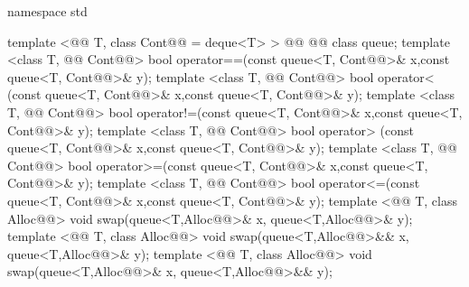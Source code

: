 \documentclass[american,twoside]{book}
\begin{document}
\begin{codeblock}
namespace std {
  template <@@ T, class Cont@@ = deque<T> >
    @@
            @@
    class queue;
  template <class T, @@ Cont@@>
    bool operator==(const queue<T, Cont@@>& x,const queue<T, Cont@@>& y);
  template <class T, @@ Cont@@>
    bool operator< (const queue<T, Cont@@>& x,const queue<T, Cont@@>& y);
  template <class T, @@ Cont@@>
    bool operator!=(const queue<T, Cont@@>& x,const queue<T, Cont@@>& y);
  template <class T, @@ Cont@@>
    bool operator> (const queue<T, Cont@@>& x,const queue<T, Cont@@>& y);
  template <class T, @@ Cont@@>
    bool operator>=(const queue<T, Cont@@>& x,const queue<T, Cont@@>& y);
  template <class T, @@ Cont@@>
    bool operator<=(const queue<T, Cont@@>& x,const queue<T, Cont@@>& y);
  template <@@ T, class Alloc@@>
    void swap(queue<T,Alloc@@>& x, queue<T,Alloc@@>& y);
  template <@@ T, class Alloc@@>
    void swap(queue<T,Alloc@@>&& x, queue<T,Alloc@@>& y);
  template <@@ T, class Alloc@@>
    void swap(queue<T,Alloc@@>& x, queue<T,Alloc@@>&& y);

}
\end{codeblock}
\end{document}
